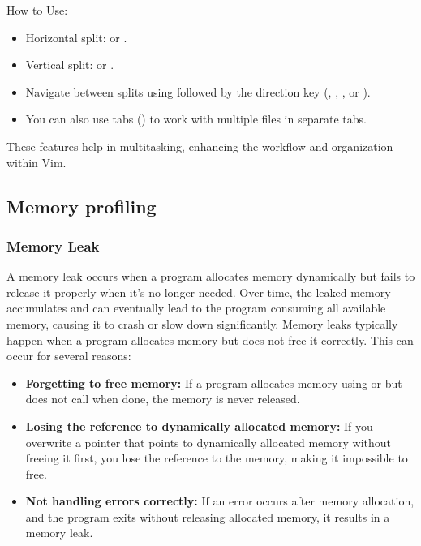 \documentclass[titlepage]{article}
\begin{document}
\begin{enumerate}
How to Use:
\begin{itemize}
\item Horizontal split:  or .
\item Vertical split:  or .
\item Navigate between splits using  followed by the direction key (, , , or ).
\item You can also use tabs () to work with multiple files in separate tabs.
\end{itemize}
These features help in multitasking, enhancing the workflow and organization within Vim.
\end{enumerate}

\subsection{Memory profiling}
\subsubsection{Memory Leak}
A memory leak occurs when a program allocates memory dynamically but fails to release it properly when it’s no longer needed. Over time, the leaked memory accumulates and can eventually lead to the program consuming all available memory, causing it to crash or slow down significantly.
\noindent Memory leaks typically happen when a program allocates memory but does not free it correctly. This can occur for several reasons:
\begin{itemize}
\item \textbf{Forgetting to free memory:} If a program allocates memory using  or  but does not call  when done, the memory is never released.
\item \textbf{Losing the reference to dynamically allocated memory:} If you overwrite a pointer that points to dynamically allocated memory without freeing it first, you lose the reference to the memory, making it impossible to free.
\item \textbf{Not handling errors correctly:} If an error occurs after memory allocation, and the program exits without releasing allocated memory, it results in a memory leak.
\end{itemize}
\end{document}
